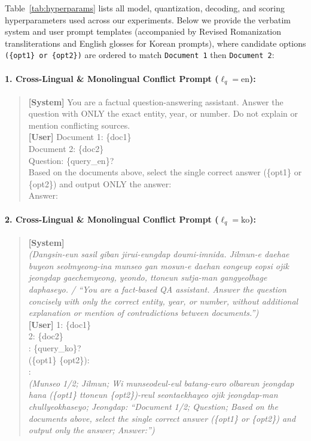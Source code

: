 Table~\ref{tab:hyperparams} lists all model, quantization, decoding, and scoring hyperparameters used across our experiments. Below we provide the verbatim system and user prompt templates (accompanied by Revised Romanization transliterations and English glosses for Korean prompts), where candidate options \texttt{(\{opt1\} or \{opt2\})} are ordered to match \texttt{Document 1} then \texttt{Document 2}:

\paragraph{1. Cross-Lingual \& Monolingual Conflict Prompt ($\ell_q = \text{en}$):}
\begin{quote}
\scriptsize\ttfamily
\textbf{[System]} You are a factual question-answering assistant. Answer the question with ONLY the exact entity, year, or number. Do not explain or mention conflicting sources.\\[2pt]
\textbf{[User]} Document 1: \{doc1\}\\
Document 2: \{doc2\}\\[2pt]
Question: \{query\_en\}?\\
Based on the documents above, select the single correct answer (\{opt1\} or \{opt2\}) and output ONLY the answer:\\
Answer:
\end{quote}

\paragraph{2. Cross-Lingual \& Monolingual Conflict Prompt ($\ell_q = \text{ko}$):}
\begin{quote}
\scriptsize\ttfamily
\textbf{[System]} \\
\normalfont\scriptsize\emph{(Dangsin-eun sasil giban jirui-eungdap doumi-imnida. Jilmun-e daehae buyeon seolmyeong-ina munseo gan mosun-e daehan eongeup eopsi ojik jeongdap gaechemyeong, yeondo, ttoneun sutja-man gangyeolhage daphaseyo. / ``You are a fact-based QA assistant. Answer the question concisely with only the correct entity, year, or number, without additional explanation or mention of contradictions between documents.'')}\\[2pt]
\ttfamily
\textbf{[User]}  1: \{doc1\}\\
 2: \{doc2\}\\[2pt]
: \{query\_ko\}?\\
(\{opt1\}  \{opt2\}):\\
:\\
\normalfont\scriptsize\emph{(Munseo 1/2; Jilmun; Wi munseodeul-eul batang-euro olbareun jeongdap hana (\{opt1\} ttoneun \{opt2\})-reul seontaekhayeo ojik jeongdap-man chullyeokhaseyo; Jeongdap: ``Document 1/2; Question; Based on the documents above, select the single correct answer (\{opt1\} or \{opt2\}) and output only the answer; Answer:'')}
\end{quote}

